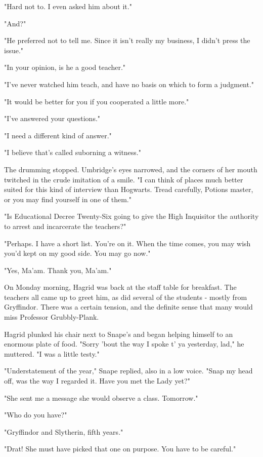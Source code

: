 \documentclass[a4paper,11pt]{article}
\begin{document}
"Hard not to. I even asked him about it."

"And?"

"He preferred not to tell me. Since it isn't really my business, I didn't press the issue."

"In your opinion, is he a good teacher."

"I've never watched him teach, and have no basis on which to form a judgment."

"It would be better for you if you cooperated a little more."

"I've answered your questions."

"I need a different kind of answer."

"I believe that's called suborning a witness."

The drumming stopped. Umbridge's eyes narrowed, and the corners of her mouth twitched in the crude imitation of a smile. "I can think of places much better suited for this kind of interview than Hogwarts. Tread carefully, Potions master, or you may find yourself in one of them."

"Is Educational Decree Twenty-Six going to give the High Inquisitor the authority to arrest and incarcerate the teachers?"

"Perhaps. I have a short list. You're on it. When the time comes, you may wish you'd kept on my good side. You may go now."

"Yes, Ma'am. Thank you, Ma'am."

On Monday morning, Hagrid was back at the staff table for breakfast. The teachers all came up to greet him, as did several of the students - mostly from Gryffindor. There was a certain tension, and the definite sense that many would miss Professor Grubbly-Plank.

Hagrid plunked his chair next to Snape's and began helping himself to an enormous plate of food. "Sorry 'bout the way I spoke t' ya yesterday, lad," he muttered. "I was a little testy."

"Understatement of the year," Snape replied, also in a low voice. "Snap my head off, was the way I regarded it. Have you met the Lady yet?"

"She sent me a message she would observe a class. Tomorrow."

"Who do you have?"

"Gryffindor and Slytherin, fifth years."

"Drat! She must have picked that one on purpose. You have to be careful."
\end{document}
